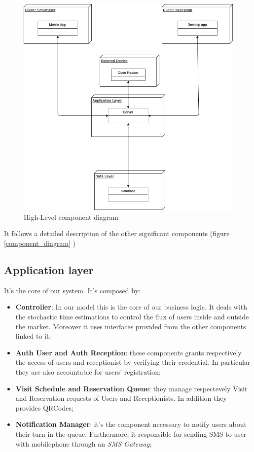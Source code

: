 \begin{figure}[H]
  \centering
  \includegraphics[scale=0.25]{diagrams/h_level.png}
  \caption{High-Level component diagram}
    \label{fig:highlevel}

\end{figure}



It follows a detailed description of the other significant components (figure       \ref{component_diagram}
)
\subsection{Application layer}
It's the core of our system. It's composed by:
\begin{itemize}
\item \textbf{Controller}: In our model this is the core of our business logic. It deals with the stochastic time estimations to control the flux of users inside and outside the market. Moreover it uses interfaces provided from the other components linked to it;
\item \textbf{Auth User and Auth Reception}: these components grants respectively the access of users and receptionist by verifying their credential. In particular they are also accountable for users' registration;
\item \textbf{Visit Schedule and Reservation Queue}: they manage respectevely Visit and Reservation requests of Users and Receptionists. In addition they provides QRCodes;
\item \textbf{Notification Manager}: it's the component necessary to notify users about their turn in the queue. Furthermore, it responsible for sending SMS to user with mobilephone through an \textit{SMS Gateway};
\end{itemize}


